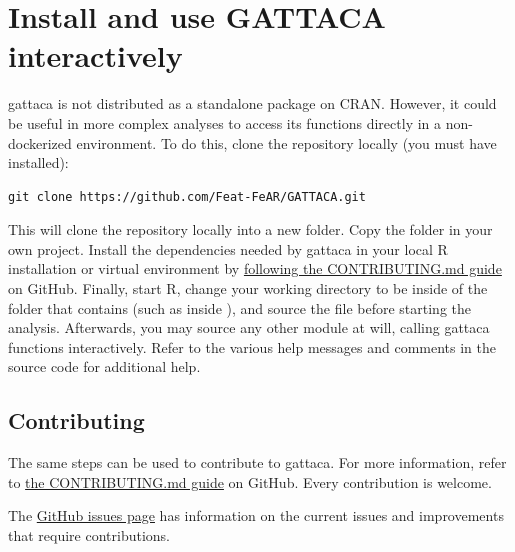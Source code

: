 \section{Install and use GATTACA interactively}
\label{localGATTA}
\gls{gattaca} is not distributed as a standalone package on CRAN. However, it could be useful in more complex analyses to access its functions directly in a non-dockerized environment. To do this, clone the repository locally (you must have  installed):
\begin{lstlisting}
git clone https://github.com/Feat-FeAR/GATTACA.git
\end{lstlisting}
This will clone the repository locally into a new  folder. Copy the  folder in your own project. Install the dependencies needed by \gls{gattaca} in your local R installation or virtual environment by \href{https://github.com/Feat-FeAR/GATTACA/blob/main/CONTRIBUTING.md}{following the CONTRIBUTING.md guide} on GitHub. Finally, start R, change your working directory to be inside of the folder that contains  (such as inside ), and source the  file before starting the analysis.
Afterwards, you may source any other module at will, calling \gls{gattaca} functions interactively. Refer to the various help messages and comments in the source code for additional help.

\subsection{Contributing}

The same steps can be used to contribute to \gls{gattaca}. For more information, refer to \href{https://github.com/Feat-FeAR/GATTACA/blob/main/CONTRIBUTING.md}{the CONTRIBUTING.md guide} on GitHub. Every contribution is welcome.

The \href{https://github.com/Feat-FeAR/GATTACA/issues}{GitHub issues page} has information on the current issues and improvements that require contributions.
